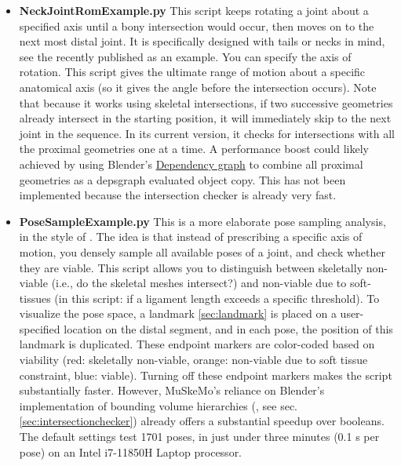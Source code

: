 \documentclass{article}
\begin{document}
\begin{itemize}
    \item \textbf{NeckJointRomExample.py} This script keeps rotating a joint about a specified axis until a bony intersection would occur, then moves on to the next most distal joint. It is specifically designed with tails or necks in mind, see the recently published \cite{diezdiazCentresRotationOsteological2025} as an example. You can specify the axis of rotation. This script gives the ultimate range of motion about a specific anatomical axis (so it gives the angle before the intersection occurs). Note that because it works using skeletal intersections, if two successive geometries already intersect in the starting position, it will immediately skip to the next joint in the sequence. In its current version, it checks for intersections with all the proximal geometries one at a time. A performance boost could likely achieved by using Blender's \href{https://docs.blender.org/api/current/bpy.types.Depsgraph.html}{Dependency graph} to combine all proximal geometries as a depsgraph evaluated object copy. This has not been implemented because the intersection checker is already very fast.
    \item \textbf{PoseSampleExample.py} This is a more elaborate pose sampling analysis, in the style of \cite{manafzadehROMMappingLigamentous2018}. The idea is that instead of prescribing a specific axis of motion, you densely sample all available poses of a joint, and check whether they are viable. This script allows you to distinguish between skeletally non-viable (i.e., do the skeletal meshes intersect?) and non-viable due to soft-tissues (in this script: if a ligament length exceeds a specific threshold). To visualize the pose space, a landmark \ref{sec:landmark} is placed on a user-specified location on the distal segment, and in each pose, the position of this landmark is duplicated. These endpoint markers are color-coded based on viability (red: skeletally non-viable, orange: non-viable due to soft tissue constraint, blue: viable). Turning off these endpoint markers makes the script substantially faster. However, MuSkeMo's reliance on Blender's implementation of bounding volume hierarchies (\cite{ericsonBoundingVolumeHierarchies2005}, see sec. \ref{sec:intersectionchecker}) already offers a substantial speedup over booleans.
    The default settings test 1701 poses, in just under three minutes (0.1 s per pose) on an Intel i7-11850H Laptop processor.


\end{itemize}
\end{document}
